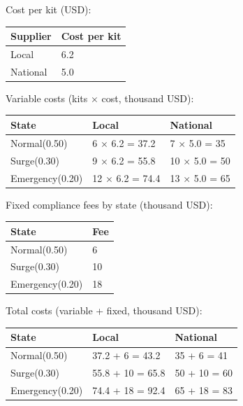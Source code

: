 \documentclass[11pt]{article}
\begin{document}
	
	Cost per kit (USD):
	\begin{center}
		\begin{tabular}{ll}
			\toprule
			Supplier & Cost per kit \\
			\midrule
			Local & 6.2 \\
			National & 5.0 \\
			\bottomrule
		\end{tabular}
	\end{center}
	
	
	Variable costs (kits × cost, thousand USD):
	\begin{center}
		\begin{tabular}{lll}
			\toprule
			State & Local & National \\
			\midrule
			Normal\newline (0.50) & 6 × 6.2 = 37.2 & 7 × 5.0 = 35 \\
			Surge\newline (0.30) & 9 × 6.2 = 55.8 & 10 × 5.0 = 50 \\
			Emergency\newline (0.20) & 12 × 6.2 = 74.4 & 13 × 5.0 = 65 \\
			\bottomrule
		\end{tabular}
	\end{center}
	
	
	Fixed compliance fees by state (thousand USD):
	\begin{center}
		\begin{tabular}{ll}
			\toprule
			State & Fee \\
			\midrule
			Normal\newline (0.50) & 6 \\
			Surge\newline (0.30) & 10 \\
			Emergency\newline (0.20) & 18 \\
			\bottomrule
		\end{tabular}
	\end{center}
	
	
	Total costs (variable + fixed, thousand USD):
	\begin{center}
		\begin{tabular}{lll}
			\toprule
			State & Local & National \\
			\midrule
			Normal\newline (0.50) & 37.2 + 6 = 43.2 & 35 + 6 = 41 \\
			Surge\newline (0.30) & 55.8 + 10 = 65.8 & 50 + 10 = 60 \\
			Emergency\newline (0.20) & 74.4 + 18 = 92.4 & 65 + 18 = 83 \\
			\bottomrule
		\end{tabular}
	\end{center}
	
\end{document}
